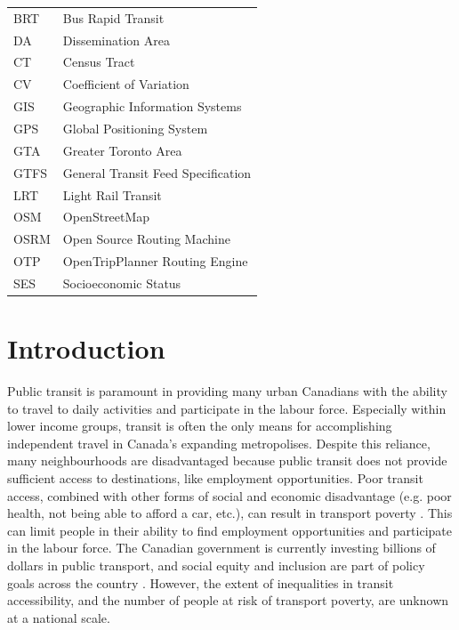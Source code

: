 \documentclass[11 pt, letterpaper]{article}
\begin{document}
{\begin{tabular}{ l l }
	BRT & Bus Rapid Transit \\
	DA & Dissemination Area \\
	CT & Census Tract \\
	CV & Coefficient of Variation \\
	GIS & Geographic Information Systems \\
	GPS & Global Positioning System \\
	GTA & Greater Toronto Area \\
	GTFS & General Transit Feed Specification \\
	LRT & Light Rail Transit \\
	OSM & OpenStreetMap \\
	OSRM & Open Source Routing Machine \\
	OTP & OpenTripPlanner Routing Engine \\
	SES & Socioeconomic Status

\end{tabular}

\newpage


\renewcommand{\thepage}{\arabic{page}}%
\setcounter{page}{1}

\section{Introduction}

Public transit is paramount in providing many urban Canadians with the ability to travel to daily activities and participate in the labour force. Especially within lower income groups, transit is often the only means for accomplishing independent travel in Canada's expanding metropolises. Despite this reliance, many neighbourhoods are disadvantaged because public transit does not provide sufficient access to destinations, like employment opportunities. Poor transit access, combined with other forms of social and economic disadvantage (e.g. poor health, not being able to afford a car, etc.), can result in transport poverty \cite{casas2007,preston2007,lucas2012}. This can limit people in their ability to find employment opportunities and participate in the labour force. The Canadian government is currently investing billions of dollars in public transport, and social equity and inclusion are part of policy goals across the country \cite{canbudget2017}. However, the extent of inequalities in transit accessibility, and the number of people at risk of transport poverty, are unknown at a national scale.

}
\end{document}
